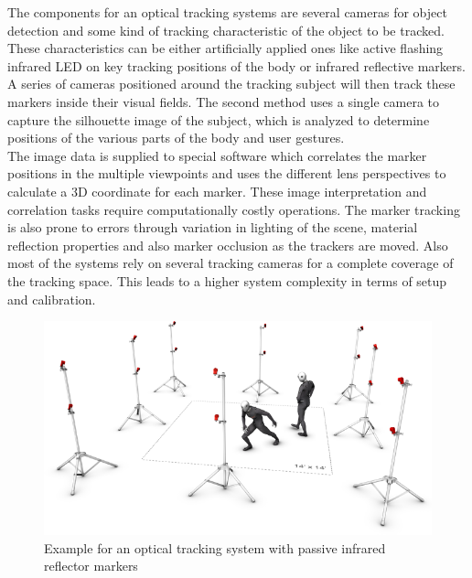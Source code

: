 The components for an optical tracking systems are several cameras for object detection and some kind of tracking characteristic of the object to be tracked. These characteristics can be either artificially applied ones like active flashing infrared LED on key tracking positions of the body or infrared reflective markers.\\ A series of cameras positioned around the tracking subject will then track these markers inside their visual fields. The second method uses a single camera to capture the silhouette image of the subject, which is analyzed to determine positions of the various parts of the body and user gestures.
\\The image data is supplied to special software which correlates the marker positions in the multiple viewpoints and uses the different lens perspectives to calculate a 3D coordinate for each marker. These image interpretation and correlation tasks require computationally costly operations. The marker tracking is also prone to errors through variation in lighting of the scene, material reflection properties and also marker occlusion as the trackers are moved. Also most of the systems rely on several tracking cameras for a complete coverage of the tracking space. This leads to a higher system complexity in terms of setup and calibration.
\begin{figure}[H]
\label{optic reflector tracking}
\includegraphics[scale=0.6]{images/flex13MocapVolume.png} 
\caption{Example for an optical tracking system with passive infrared reflector markers \cite{optitrack.2017}}
\end{figure}
